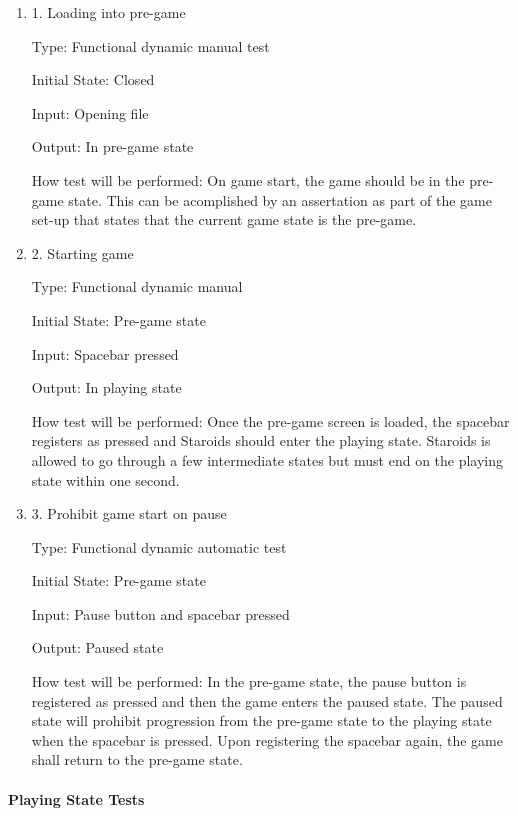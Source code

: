 \documentclass[12pt, titlepage]{article}
\begin{document}
\begin{enumerate}

\item{1. Loading into pre-game\\}

Type: Functional dynamic manual test

Initial State: Closed

Input: Opening file

Output: In pre-game state

How test will be performed: On game start, the game should be in the pre-game state. This can be acomplished by an assertation as part of the game set-up that states that the current game state is the pre-game.

\item{2. Starting game\\}

Type: Functional dynamic manual

Initial State: Pre-game state

Input: Spacebar pressed

Output: In playing state

How test will be performed: Once the pre-game screen is loaded, the spacebar registers as pressed and Staroids should enter the playing state. Staroids is allowed to go through a few intermediate states but must end on the playing state within one second.

\item{3. Prohibit game start on pause\\}

Type: Functional dynamic automatic test

Initial State: Pre-game state

Input: Pause button and spacebar pressed

Output: Paused state

How test will be performed: In the pre-game state, the pause button is registered as pressed and then the game enters the paused state. The paused state will prohibit progression from the pre-game state to the playing state when the spacebar is pressed. Upon registering the spacebar again, the game shall return to the pre-game state.

\end{enumerate}

\paragraph{Playing State Tests}
\end{document}

